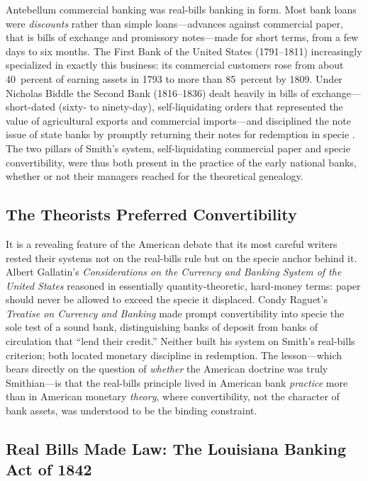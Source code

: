 \documentclass[12pt]{article}
\begin{document}
Antebellum commercial banking was real-bills banking in form.  Most bank loans
were \emph{discounts} rather than simple loans---advances against commercial
paper, that is bills of exchange and promissory notes---made for short terms, from
a few days to six months.  The First Bank of the United States (1791--1811)
increasingly specialized in exactly this business: its commercial customers rose
from about 40~percent of earning assets in 1793 to more than 85~percent by 1809.
Under Nicholas Biddle the Second Bank (1816--1836) dealt heavily in bills of
exchange---short-dated (sixty- to ninety-day), self-liquidating orders that
represented the value of agricultural exports and commercial imports---and
disciplined the note issue of state banks by promptly returning their notes for
redemption in specie \citep{hammond1957banks}.  The two pillars of Smith's
system, self-liquidating commercial paper and specie convertibility, were thus
both present in the practice of the early national banks, whether or not their
managers reached for the theoretical genealogy.

\subsection{The Theorists Preferred Convertibility}

It is a revealing feature of the American debate that its most careful writers
rested their systems not on the real-bills rule but on the specie anchor behind
it.  Albert Gallatin's \emph{Considerations on the Currency and Banking System of
the United States} \citep{gallatin1831considerations} reasoned in essentially
quantity-theoretic, hard-money terms: paper should never be allowed to exceed the
specie it displaced.  Condy Raguet's \emph{Treatise on Currency and Banking}
\citep{raguet1839treatise} made prompt convertibility into specie the sole test of
a sound bank, distinguishing banks of deposit from banks of circulation that
``lend their credit.''  Neither built his system on Smith's real-bills criterion;
both located monetary discipline in redemption.  The lesson---which bears directly
on the question of \emph{whether} the American doctrine was truly Smithian---is
that the real-bills principle lived in American bank \emph{practice} more than in
American monetary \emph{theory}, where convertibility, not the character of bank
assets, was understood to be the binding constraint.

\subsection{Real Bills Made Law: The Louisiana Banking Act of 1842}
\end{document}
